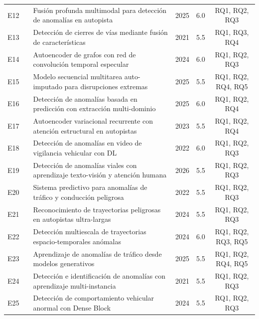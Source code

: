\documentclass[12pt, a4paper]{article}
\begin{document}
\begin{longtable}{clp{4.2cm}ccc}
E12 & \cite{duan2025multimodal}     & Fusi\'{o}n profunda multimodal para detecci\'{o}n de anomal\'{i}as en autopista & 2025 & 6.0 & RQ1, RQ2, RQ3 \\
E13 & \cite{cai2021road}            & Detecci\'{o}n de cierres de v\'{i}as mediante fusi\'{o}n de caracter\'{i}sticas & 2021 & 5.5 & RQ1, RQ3, RQ4 \\
E14 & \cite{ren2024graph}           & Autoencoder de grafos con red de convoluci\'{o}n temporal especular & 2024 & 6.0 & RQ1, RQ2, RQ3 \\
E15 & \cite{nouri2025self}          & Modelo secuencial multitarea auto-imputado para disrupciones extremas & 2025 & 5.5 & RQ1, RQ2, RQ4, RQ5 \\
E16 & \cite{jia2025prediction}      & Detecci\'{o}n de anomal\'{i}as basada en predicci\'{o}n con extracci\'{o}n multi-dominio & 2025 & 6.0 & RQ1, RQ2, RQ4 \\
E17 & \cite{chakraborty2023structural} & Autoencoder variacional recurrente con atenci\'{o}n estructural en autopistas & 2023 & 5.5 & RQ1, RQ2, RQ4 \\
E18 & \cite{khan2022anomaly}        & Detecci\'{o}n de anomal\'{i}as en video de vigilancia vehicular con DL & 2022 & 6.0 & RQ1, RQ2, RQ3 \\
E19 & \cite{chai2026road}           & Detecci\'{o}n de anomal\'{i}as viales con aprendizaje texto-visi\'{o}n y atenci\'{o}n humana & 2026 & 5.5 & RQ1, RQ2, RQ3 \\
E20 & \cite{riaz2022traffic}        & Sistema predictivo para anomal\'{i}as de tr\'{a}fico y conducci\'{o}n peligrosa & 2022 & 5.5 & RQ1, RQ2, RQ3 \\
E21 & \cite{zhao2024multiadjacent}  & Reconocimiento de trayectorias peligrosas en autopistas ultra-largas & 2024 & 5.5 & RQ1, RQ2, RQ3 \\
E22 & \cite{wang2024multiscale}     & Detecci\'{o}n multiescala de trayectorias espacio-temporales an\'{o}malas & 2024 & 6.0 & RQ1, RQ2, RQ3, RQ5 \\
E23 & \cite{giasemis2025learning}   & Aprendizaje de anomal\'{i}as de tr\'{a}fico desde modelos generativos & 2025 & 5.5 & RQ1, RQ2, RQ4, RQ5 \\
E24 & \cite{feng2021traffic}        & Detecci\'{o}n e identificaci\'{o}n de anomal\'{i}as con aprendizaje multi-instancia & 2021 & 5.5 & RQ1, RQ2, RQ3 \\
E25 & \cite{lu2024vehicle}          & Detecci\'{o}n de comportamiento vehicular anormal con Dense Block & 2024 & 5.5 & RQ1, RQ2, RQ3 \\
\end{longtable}
\end{document}
